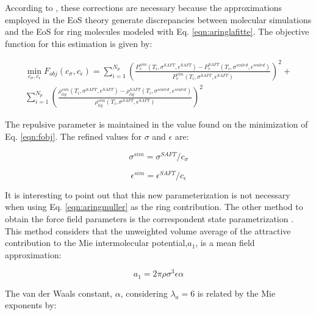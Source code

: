 	According to , these corrections are necessary because the approximations employed in the EoS theory generate discrepancies between molecular simulations and the EoS for ring molecules modeled with Eq. \eqref{eqn:aringlafitte}. The objective function for this estimation is given by:
	
	\begin{equation}
	\begin{split}
	\min\limits_{c_{\sigma},c_{\epsilon}} F_{obj}(c_{\sigma},c_{\epsilon})= \sum_{i=1}^{N_{p}} \left(\frac{P_{v}^{sim}(T_{i},\sigma^{SAFT},\epsilon^{SAFT})-P_{v}^{SAFT}(T_{i},\sigma^{scaled},\epsilon^{scaled})}{P_{v}^{sim}(T_{i},\sigma^{SAFT},\epsilon^{SAFT})} \right)^2 + \\
	\sum_{i=1}^{N_{p}} \left(\frac{\rho_{liq}^{sim}(T_{i},\sigma^{SAFT},\epsilon^{SAFT})-\rho_{liq}^{SAFT}(T_{i},\sigma^{scaled},\epsilon^{scaled})}{\rho_{liq}^{sim}(T_{i},\sigma^{SAFT},\epsilon^{SAFT})} \right)^2
	\end{split}
	\label{eqn:fobjla}
	\end{equation}
	
	The repulsive parameter is maintained in the value found on the minimization of Eq. \eqref{eqn:fobj}. The refined values for $\sigma$ and $\epsilon$ are:
	
	\begin{equation}
	\sigma^{sim} = \sigma^{SAFT}/c_{\sigma}
	\label{eqn:simsigma}
	\end{equation}
	
	\begin{equation}
	\epsilon^{sim} = \epsilon^{SAFT}/c_{\epsilon}
	\label{eqn:simeps}
	\end{equation}
	
	It is interesting to point out that this new parameterization is not necessary when using Eq. \eqref{eqn:aringmuller} as the ring contribution. The other method to obtain the force field parameters is the correspondent state parametrization \cite{mejia2014}. This method considers that the unweighted volume average of the attractive contribution to the Mie intermolecular potential,$a_{1}$, is a mean field approximation:
	
	\begin{equation}
	a_{1} = 2\pi\rho\sigma^{3}\epsilon\alpha
	\label{eqn:a1corres}
	\end{equation}
	
	The van der Waals constant, $\alpha$, considering $ \lambda_{a} = 6$ is related by the Mie exponents by:
	
